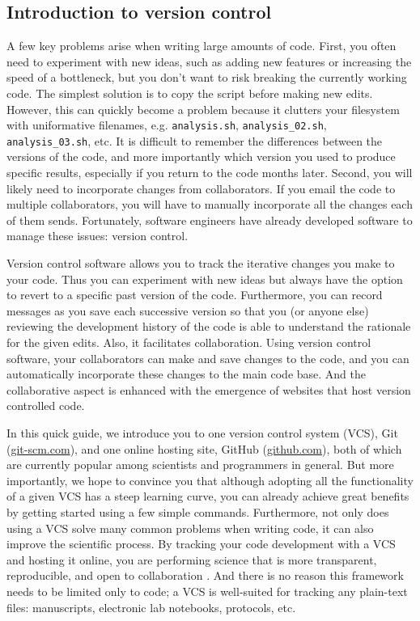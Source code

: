 \subsection{Introduction to version control}

A few key problems arise when writing large amounts of code.
First, you often need to experiment with new ideas, such as adding new features or increasing the speed of a bottleneck, but you don't want to risk breaking the currently working code.
The simplest solution is to copy the script before making new edits.
However, this can quickly become a problem because it clutters your filesystem with uniformative filenames, e.g. \verb|analysis.sh|, \verb|analysis_02.sh|, \verb|analysis_03.sh|, etc.
It is difficult to remember the differences between the versions of the code, and more importantly which version you used to produce specific results, especially if you return to the code months later.
Second, you will likely need to incorporate changes from collaborators.
If you email the code to multiple collaborators, you will have to manually incorporate all the changes each of them sends.
Fortunately, software engineers have already developed software to manage these issues: version control.

Version control software allows you to track the iterative changes you make to your code.
Thus you can experiment with new ideas but always have the option to revert to a specific past version of the code.
Furthermore, you can record messages as you save each successive version so that you (or anyone else) reviewing the development history of the code is able to understand the rationale for the given edits.
Also, it facilitates collaboration.
Using version control software, your collaborators can make and save changes to the code, and you can automatically incorporate these changes to the main code base.
And the collaborative aspect is enhanced with the emergence of websites that host version controlled code.

In this quick guide, we introduce you to one version control system (VCS), Git (\href{http://git-scm.com/}{git-scm.com}), and one online hosting site, GitHub (\href{https://github.com}{github.com}), both of which are currently popular among scientists and programmers in general.
But more importantly, we hope to convince you that although adopting all the functionality of a given VCS has a steep learning curve, you can already achieve great benefits by getting started using a few simple commands.
Furthermore, not only does using a VCS solve many common problems when writing code, it can also improve the scientific process.
By tracking your code development with a VCS and hosting it online, you are performing science that is more transparent, reproducible, and open to collaboration \cite{23448176}.
And there is no reason this framework needs to be limited only to code; a VCS is well-suited for tracking any plain-text files: manuscripts, electronic lab notebooks, protocols, etc.